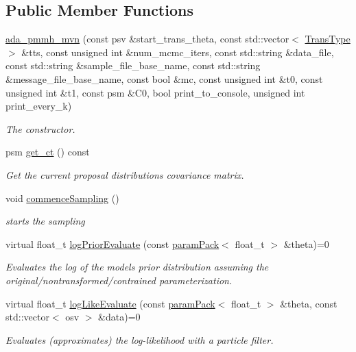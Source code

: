 \subsection*{Public Member Functions}
\begin{DoxyCompactItemize}
\item 
\hyperlink{classada__pmmh__mvn_a749d2c42d1c5741edeb55b641dca9625}{ada\+\_\+pmmh\+\_\+mvn} (const psv \&start\+\_\+trans\+\_\+theta, const std\+::vector$<$ \hyperlink{param__transforms_8h_acee593b112f4fc85f850631b9c6aaae9}{Trans\+Type} $>$ \&tts, const unsigned int \&num\+\_\+mcmc\+\_\+iters, const std\+::string \&data\+\_\+file, const std\+::string \&sample\+\_\+file\+\_\+base\+\_\+name, const std\+::string \&message\+\_\+file\+\_\+base\+\_\+name, const bool \&mc, const unsigned int \&t0, const unsigned int \&t1, const psm \&C0, bool print\+\_\+to\+\_\+console, unsigned int print\+\_\+every\+\_\+k)
\begin{DoxyCompactList}\small\item\em The constructor. \end{DoxyCompactList}\item 
psm \hyperlink{classada__pmmh__mvn_a06930a79f4d2a62aa0cf24528c77e5a7}{get\+\_\+ct} () const
\begin{DoxyCompactList}\small\item\em Get the current proposal distribution\textquotesingle{}s covariance matrix. \end{DoxyCompactList}\item 
\mbox{\label{classada__pmmh__mvn_a891d79acc39485cdd9104bdf120bec7a}} 
void \hyperlink{classada__pmmh__mvn_a891d79acc39485cdd9104bdf120bec7a}{commence\+Sampling} ()
\begin{DoxyCompactList}\small\item\em starts the sampling \end{DoxyCompactList}\item 
virtual float\+\_\+t \hyperlink{classada__pmmh__mvn_af946eae70a63045515ed7830c35106dc}{log\+Prior\+Evaluate} (const \hyperlink{classparamPack}{param\+Pack}$<$ float\+\_\+t $>$ \&theta)=0
\begin{DoxyCompactList}\small\item\em Evaluates the log of the model\textquotesingle{}s prior distribution assuming the original/nontransformed/contrained parameterization. \end{DoxyCompactList}\item 
virtual float\+\_\+t \hyperlink{classada__pmmh__mvn_a82d43085173fd0ed33ee42de9be48b77}{log\+Like\+Evaluate} (const \hyperlink{classparamPack}{param\+Pack}$<$ float\+\_\+t $>$ \&theta, const std\+::vector$<$ osv $>$ \&data)=0
\begin{DoxyCompactList}\small\item\em Evaluates (approximates) the log-\/likelihood with a particle filter. \end{DoxyCompactList}\end{DoxyCompactItemize}
